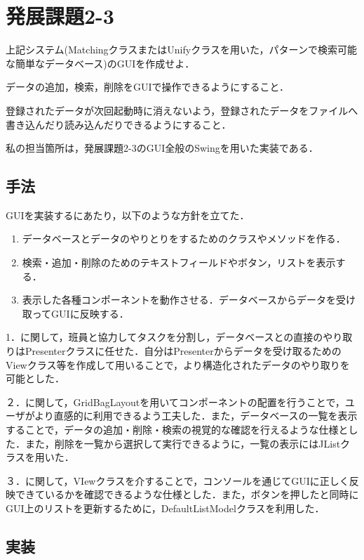 \documentclass[12pt]{jarticle}
\begin{document}
\section{発展課題2-3}
\begin{screen}
上記システム(MatchingクラスまたはUnifyクラスを用いた，パターンで検索可能な簡単なデータベース)のGUIを作成せよ．

データの追加，検索，削除をGUIで操作できるようにすること．

登録されたデータが次回起動時に消えないよう，登録されたデータをファイルへ書き込んだり読み込んだりできるようにすること．
\end{screen}
私の担当箇所は，発展課題2-3のGUI全般のSwingを用いた実装である．

\subsection{手法}
GUIを実装するにあたり，以下のような方針を立てた．
\begin{enumerate}
\item データベースとデータのやりとりをするためのクラスやメソッドを作る．
\item 検索・追加・削除のためのテキストフィールドやボタン，リストを表示する．
\item 表示した各種コンポーネントを動作させる．データベースからデータを受け取ってGUIに反映する．
\end{enumerate}

1．に関して，班員と協力してタスクを分割し，データベースとの直接のやり取りはPresenterクラスに任せた．自分はPresenterからデータを受け取るためのViewクラス等を作成して用いることで，より構造化されたデータのやり取りを可能とした．

２．に関して，GridBagLayoutを用いてコンポーネントの配置を行うことで，ユーザがより直感的に利用できるよう工夫した．また，データベースの一覧を表示することで，データの追加・削除・検索の視覚的な確認を行えるような仕様とした．また，削除を一覧から選択して実行できるように，一覧の表示にはJListクラスを用いた．

３．に関して，VIewクラスを介することで，コンソールを通じてGUIに正しく反映できているかを確認できるような仕様とした．また，ボタンを押したと同時にGUI上のリストを更新するために，DefaultListModelクラスを利用した．

\clearpage

\subsection{実装}
\end{document}
